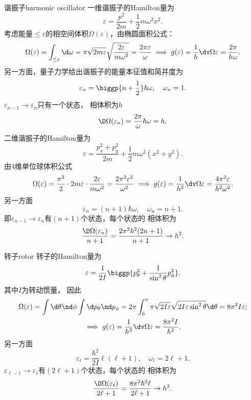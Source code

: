 \begin{example}{谐振子}{harmonic oscillator}
	一维谐振子的Hamilton量为
	\[
		\varepsilon=\frac{p^2}{2m}+\frac12m\omega^2x^2.
	\]
	考虑能量$\leq\varepsilon$的相空间体积$\Omega(\varepsilon)$，由椭圆面积公式：
	\begin{equation}
		\Omega(\varepsilon)=\int_{\leq\varepsilon}\d\omega=\pi\sqrt{2m\varepsilon}\sqrt{\frac{2\varepsilon}{m\omega^2}}=\frac{2\pi\varepsilon}\omega
		\implies
		g(\varepsilon)=\frac1h\dv\Omega\varepsilon=\frac{2\pi}{h\omega}.
	\end{equation}
	另一方面，量子力学给出谐振子的能量本征值和简并度为
	\[
		\varepsilon_n=\biggp{n+\frac12}\hbar\omega,\quad\omega_n=1.
	\]
	$\varepsilon_{n-1}\to\varepsilon_n$只有一个状态，
	相体积为$h$
	\[
		\D\Omega(\varepsilon_n)=\frac{2\pi}\omega\hbar\omega=h.
	\]
	\tcblower
	二维谐振子的Hamilton量为
	\[
		\varepsilon=\frac{p_x^2+p_y^2}{2m}+\frac12m\omega^2(x^2+y^2).
	\]
	由4维单位球体积公式
	\begin{equation}
		\Omega(\varepsilon)=\frac{\pi^2}2\cdot2m\varepsilon\cdot\frac{2\varepsilon}{m\omega^2}=\frac{2\pi^2\varepsilon^2}{\omega^2}
		\implies
		g(\varepsilon)=\frac1{h^2 }\dv\Omega\varepsilon=\frac{4\pi^2\varepsilon}{h^2\omega^2}.
	\end{equation}
	另一方面
	\[
		\varepsilon_n=(n+1)\hbar\omega,\quad\omega_n=n+1.
	\]
	即$\varepsilon_{n-1}\to\varepsilon_n$有$(n+1)$个状态，每个状态的
	相体积为
	\[
		\frac{\D\Omega(\varepsilon_n)}{n+1}=\frac{2\pi^2\hbar^2(2n+1)}{n+1}\to h^2.
	\]
\end{example}
\begin{example}{转子}{rotor}
	转子的Hamilton量为
	\[
		\varepsilon=\frac1{2I}\biggp{p_\theta^2+\frac1{\sin^2\theta}p_\phi^2}.
	\]
	其中$I$为转动惯量，
	因此
	\begin{gather}\notag
		\Omega(\varepsilon)=\int\d\theta\nd\phi\int\d p_\theta\nd p_\phi=2\pi\int_0^\pi\pi\sqrt{2I\varepsilon}\sqrt{2I\varepsilon\sin^2\theta}\d\theta=8\pi^2I\varepsilon;\\
		\implies
		g(\varepsilon)=\frac1{h^2}\dv\Omega\varepsilon=\frac{8\pi^2I}{h^2}.
	\end{gather}
	另一方面
	\[
		\varepsilon_\ell=\frac{\hbar^2}{2I}\ell(\ell+1),\quad\omega_\ell=2\ell+1.
	\]
	$\varepsilon_{\ell-1}\to\varepsilon_\ell$有$(2\ell+1)$个状态，每个状态的
	相体积为
	\[
		\frac{\D\Omega(\varepsilon_\ell)}{2\ell+1}=\frac{8\pi^2\hbar^2\ell}{2\ell+1}\to h^2.
	\]
\end{example}
